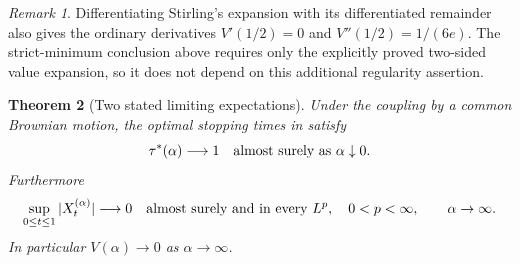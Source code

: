 \documentclass[11pt,a4paper]{article}
\newtheorem{theorem}{Theorem}[section]
\theoremstyle{definition}
\theoremstyle{remark}
\newtheorem{remark}[theorem]{Remark}
\numberwithin{equation}{section}
\begin{document}
\begin{remark}
Differentiating Stirling's expansion with its differentiated remainder
also gives the ordinary derivatives $V'(1/2)=0$ and
$V''(1/2)=1/(6e)$. The strict-minimum conclusion above requires only
the explicitly proved two-sided value expansion, so it does not
depend on this additional regularity assertion.
\end{remark}

\begin{theorem}[Two stated limiting expectations]\label{p2:thm:gorgens-limits}
Under the coupling by a common Brownian motion, the optimal stopping
times in \cite[equation~(10)]{p2:Gorgens2014} satisfy
\[
 \tau^*(\alpha)\longrightarrow1\quad\hbox{almost surely as }\alpha\downarrow0.
\]
Furthermore
\[
 \sup_{0\leq t\leq1}|X_t^{(\alpha)}|\longrightarrow0
 \quad\hbox{almost surely and in every }L^p,\quad 0<p<\infty,
 \qquad \alpha\to\infty.
\]
In particular $V(\alpha)\to0$ as $\alpha\to\infty$.
\end{theorem}
\end{document}
